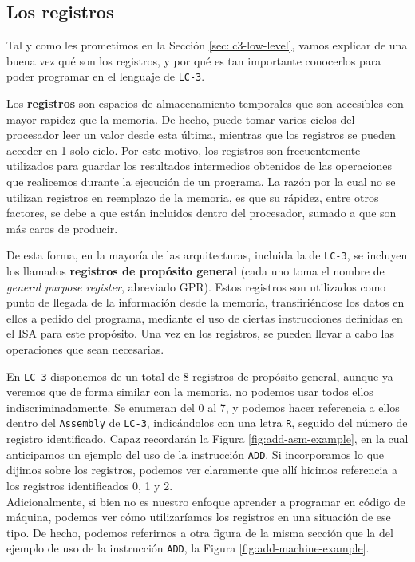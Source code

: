 \documentclass[a4paper, titlepage]{report}
\begin{document}
	\subsection{Los registros}
	\label{sec:registers}
	
	Tal y como les prometimos en la Sección \ref{sec:lc3-low-level}, vamos explicar de una buena vez qué son los registros, y por qué es tan importante conocerlos para poder programar en el lenguaje de \texttt{LC-3}.
	
	Los \textbf{registros} son espacios de almacenamiento temporales que son accesibles con mayor rapidez que la memoria. De hecho, puede tomar varios ciclos del procesador leer un valor desde esta última, mientras que los registros se pueden acceder en 1 solo ciclo. Por este motivo, los registros son frecuentemente utilizados para guardar los resultados intermedios obtenidos de las operaciones que realicemos durante la ejecución de un programa. La razón por la cual no se utilizan registros en reemplazo de la memoria, es que su rápidez, entre otros factores, se debe a que están incluidos dentro del procesador, sumado a que son más caros de producir.
	
	De esta forma, en la mayoría de las arquitecturas, incluida la de \texttt{LC-3}, se incluyen los llamados \textbf{registros de propósito general} (cada uno toma el nombre de \textit{general purpose register}, abreviado GPR). Estos registros son utilizados como punto de llegada de la información desde la memoria, transfiriéndose los datos en ellos a pedido del programa, mediante el uso de ciertas instrucciones definidas en el ISA para este propósito. Una vez en los registros, se pueden llevar a cabo las operaciones que sean necesarias.
	
	En \texttt{LC-3} disponemos de un total de 8 registros de propósito general, aunque ya veremos que de forma similar con la memoria, no podemos usar todos ellos indiscriminadamente. Se enumeran del 0 al 7, y podemos hacer referencia a ellos dentro del \texttt{Assembly} de \texttt{LC-3}, indicándolos con una letra \texttt{R}, seguido del número de registro identificado. Capaz recordarán la Figura \ref{fig:add-asm-example}, en la cual anticipamos un ejemplo del uso de la instrucción \texttt{ADD}. Si incorporamos lo que dijimos sobre los registros, podemos ver claramente que allí hicimos referencia a los registros identificados 0, 1 y 2.\\
	
	Adicionalmente, si bien no es nuestro enfoque aprender a programar en código de máquina, podemos ver cómo utilizaríamos los registros en una situación de ese tipo. De hecho, podemos referirnos a otra figura de la misma sección que la del ejemplo de uso de la instrucción \texttt{ADD}, la Figura \ref{fig:add-machine-example}.
	
\end{document}
